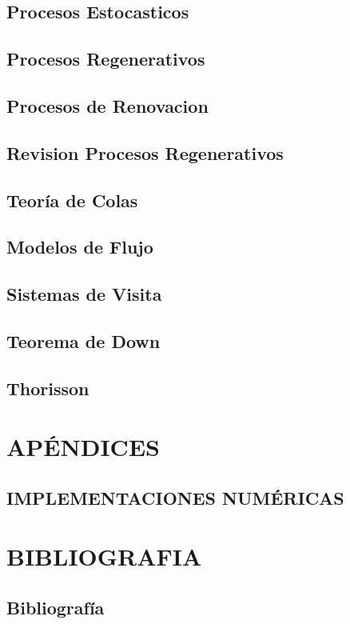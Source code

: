 \documentclass{report}
\begin{document}
\chapter{Procesos Estocasticos}


\chapter{Procesos Regenerativos}


\chapter{Procesos de Renovacion}


\chapter{Revision Procesos Regenerativos}


\chapter{Teoría de Colas}


\chapter{Modelos de Flujo}


\chapter{Sistemas de Visita}


\chapter{Teorema de Down}


\chapter{Thorisson}



\part{APÉNDICES}

\chapter{IMPLEMENTACIONES NUMÉRICAS}

\part{BIBLIOGRAFIA}

\chapter{Bibliografía}

\end{document}
